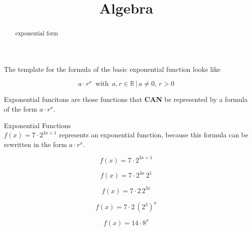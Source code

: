 \documentclass{ximera}
\title{Algebra}
\begin{document}
\begin{abstract}
exponential form
\end{abstract}
\maketitle










The template for the formula of the basic exponential function looks like



\[  a \cdot r^x   \, \text{ with } \,  a, r \in \mathbb{R} \, | \,  a \ne 0, \, r > 0   \]




Exponential funcitons are those functions that \textbf{\textcolor{red!80!black}{CAN}} be represented by a formula of the form $a \cdot r^x$.
















\begin{example}  Exponential Functions \\



$f(x) = 7 \cdot 2^{3x+1} $ represents an exponential function, because this formula can be rewritten in the form $a \cdot r^x$.   \\


\begin{explanation}


\[
f(x) = 7 \cdot 2^{3x+1}
\]


\[
f(x) = 7 \cdot 2^{3x}  \, 2^1
\]

\[
f(x) = 7 \cdot 2 \, 2^{3x} 
\]

\[
f(x) = 7 \cdot 2 \, (2^3)^x 
\]

\[
f(x) = 14 \cdot 8^x 
\]


\end{explanation}

\end{example}
\end{document}
